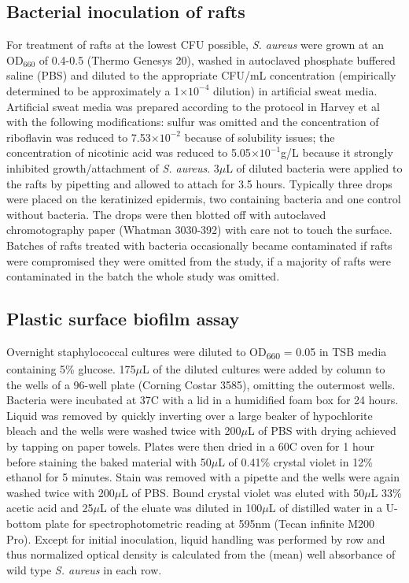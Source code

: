 \documentclass[10pt,letterpaper]{article}
\providecommand{\e}[1]{\ensuremath{\times 10^{#1}}}
\begin{document}
\subsection*{Bacterial inoculation of rafts}
For treatment of rafts at the lowest CFU possible, \textit{S. aureus} were grown at an OD$_{660}$ of 0.4-0.5 (Thermo Genesys 20), washed in autoclaved phosphate buffered saline (PBS) and diluted to the appropriate CFU/mL concentration (empirically determined to be approximately a 1\e{-4} dilution) in artificial sweat media.
Artificial sweat media was prepared according to the protocol in Harvey et al~\cite{harvey_formulation_2010} with the following modifications:
sulfur was omitted and the concentration of riboflavin was reduced to 7.53\e{-2} because of solubility issues;
the concentration of nicotinic acid was reduced to 5.05\e{-1}g/L because it strongly inhibited growth/attachment of \textit{S. aureus}.
3$\mu$L of diluted bacteria were applied to the rafts by pipetting and allowed to attach for 3.5 hours.
Typically three drops were placed on the keratinized epidermis, two containing bacteria and one control without bacteria.
The drops were then blotted off with autoclaved chromotography paper (Whatman 3030-392) with care not to touch the surface.
Batches of rafts treated with bacteria occasionally became contaminated if rafts were compromised they were omitted from the study, if a majority of rafts were contaminated in the batch the whole study was omitted.

\subsection*{Plastic surface biofilm assay}
Overnight staphylococcal cultures were diluted to OD\textsubscript{660} = 0.05 in TSB media containing 5\% glucose.
175$\mu$L of the diluted cultures were added by column to the wells of a 96-well plate (Corning Costar 3585), omitting the outermost wells.
Bacteria were incubated at 37\degree C with a lid in a humidified foam box for 24 hours.
Liquid was removed by quickly inverting over a large beaker of hypochlorite bleach and the wells were washed twice with 200$\mu$L of PBS with drying achieved by tapping on paper towels.
Plates were then dried in a 60\degree C oven for 1 hour before staining the baked material with 50$\mu$L of 0.41\% crystal violet in 12\% ethanol for 5 minutes.
Stain was removed with a pipette and the wells were again washed twice with 200$\mu$L of PBS.
Bound crystal violet was eluted with 50$\mu$L 33\% acetic acid and 25$\mu$L of the eluate was diluted in 100$\mu$L of distilled water in a U-bottom plate for spectrophotometric reading at 595nm (Tecan infinite M200 Pro).
Except for initial inoculation, liquid handling was performed by row and thus normalized optical density is calculated from the (mean) well absorbance of wild type \textit{S. aureus} in each row.
\end{document}
